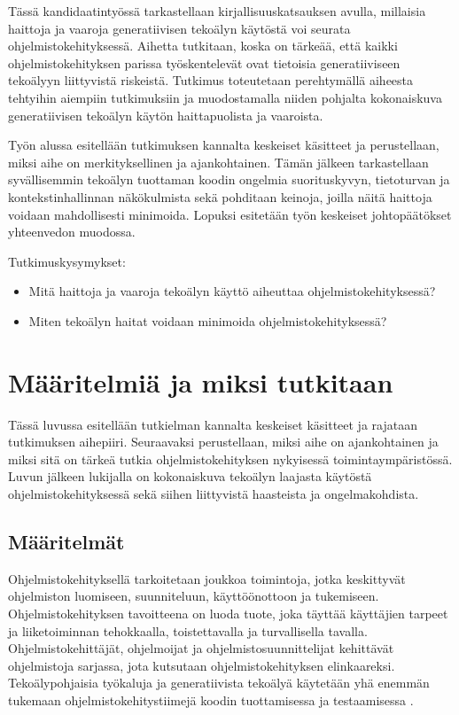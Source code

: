 \documentclass[utf8,bachelor]{gradu3}
\begin{document}
Tässä kandidaatintyössä tarkastellaan kirjallisuuskatsauksen avulla, millaisia haittoja ja vaaroja generatiivisen tekoälyn käytöstä voi seurata ohjelmistokehityksessä. Aihetta tutkitaan, koska on tärkeää, että kaikki ohjelmistokehityksen parissa työskentelevät ovat tietoisia generatiiviseen tekoälyyn liittyvistä riskeistä. Tutkimus toteutetaan perehtymällä aiheesta tehtyihin aiempiin tutkimuksiin ja muodostamalla niiden pohjalta kokonaiskuva generatiivisen tekoälyn käytön haittapuolista ja vaaroista.

Työn alussa esitellään tutkimuksen kannalta keskeiset käsitteet ja perustellaan, miksi aihe on merkityksellinen ja ajankohtainen. Tämän jälkeen tarkastellaan syvällisemmin tekoälyn tuottaman koodin ongelmia suorituskyvyn, tietoturvan ja kontekstinhallinnan näkökulmista sekä pohditaan keinoja, joilla näitä haittoja voidaan mahdollisesti minimoida. Lopuksi esitetään työn keskeiset johtopäätökset yhteenvedon muodossa.

Tutkimuskysymykset:
\begin{itemize}
	\item Mitä haittoja ja vaaroja tekoälyn käyttö aiheuttaa ohjelmistokehityksessä?
	\item Miten tekoälyn haitat voidaan minimoida ohjelmistokehityksessä?
\end{itemize}

\chapter{Määritelmiä ja miksi tutkitaan}

Tässä luvussa esitellään tutkielman kannalta keskeiset käsitteet ja rajataan tutkimuksen aihepiiri. Seuraavaksi perustellaan, miksi aihe on ajankohtainen ja miksi sitä on tärkeä tutkia ohjelmistokehityksen nykyisessä toimintaympäristössä. Luvun jälkeen lukijalla on kokonaiskuva tekoälyn laajasta käytöstä ohjelmistokehityksessä sekä siihen liittyvistä haasteista ja ongelmakohdista.

\section{Määritelmät}

Ohjelmistokehityksellä tarkoitetaan joukkoa toimintoja, jotka keskittyvät ohjelmiston luomiseen, suunniteluun, käyttöönottoon ja tukemiseen. Ohjelmistokehityksen tavoitteena on luoda tuote, joka täyttää käyttäjien tarpeet ja liiketoiminnan tehokkaalla, toistettavalla ja turvallisella tavalla. Ohjelmistokehittäjät, ohjelmoijat ja ohjelmistosuunnittelijat kehittävät ohjelmistoja sarjassa, jota kutsutaan ohjelmistokehityksen elinkaareksi. Tekoälypohjaisia työkaluja ja generatiivista tekoälyä käytetään yhä enemmän tukemaan ohjelmistokehitystiimejä koodin tuottamisessa ja testaamisessa \parencite{noauthor_what_2024}.
\end{document}
